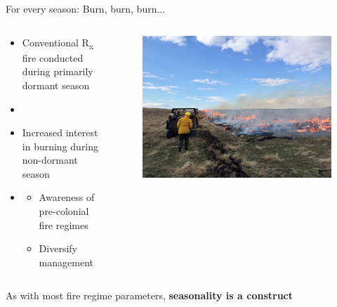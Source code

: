 \documentclass[11pt]{beamer}
\begin{document}
\begin{frame}{For every season: Burn, burn, burn...}
	
	\begin{columns}
		\begin{column}{0.5\textwidth}
			\begin{itemize} 
				\item Conventional R\textsubscript{x} fire conducted during primarily dormant season
				\item[]
				\item Increased interest in burning during non-dormant season
				\item[]
				\begin{itemize}
					\item Awareness of pre-colonial fire regimes
					\item Diversify management
				\end{itemize}
				
			\end{itemize}
			
		\end{column}
		\begin{column}{0.5\textwidth}  
			\begin{center}
				\begin{figure}
					\includegraphics[width=1\linewidth]{figs/StreeterRxFire} 
					
				\end{figure}
			\end{center}
		\end{column}
	\end{columns}
\alert{As with most fire regime parameters, \textbf{seasonality is a construct}}
\end{frame}
\end{document}

